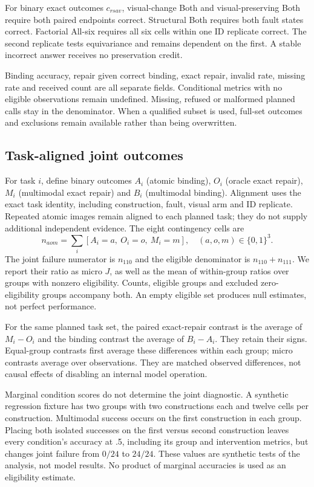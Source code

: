 \documentclass[10pt,twocolumn,letterpaper]{article}
\begin{document}
For binary exact outcomes $c_{rsav}$, visual-change Both and
visual-preserving Both require both paired endpoints correct.
Structural Both requires both fault states correct. Factorial
All-six requires all six cells within one ID replicate correct.
The second replicate tests equivariance and remains dependent on
the first. A stable incorrect answer receives no preservation credit.

Binding accuracy, repair given correct binding, exact repair,
invalid rate, missing rate and received count are all separate fields.
Conditional metrics with no eligible observations remain undefined.
Missing, refused or malformed planned calls stay in the denominator.
When a qualified subset is used, full-set outcomes and exclusions
remain available rather than being overwritten.

\subsection{Task-aligned joint outcomes}
For task $i$, define binary outcomes $A_i$ (atomic binding),
$O_i$ (oracle exact repair), $M_i$ (multimodal exact repair) and
$B_i$ (multimodal binding). Alignment uses the exact task identity,
including construction, fault, visual arm and ID replicate.
Repeated atomic images remain aligned to each planned task; they
do not supply additional independent evidence.
The eight contingency cells are
\[
n_{aom}=\sum_i[A_i=a,\ O_i=o,\ M_i=m],
\quad(a,o,m)\in\{0,1\}^3 .
\]
The joint failure numerator is $n_{110}$ and the eligible
denominator is $n_{110}+n_{111}$. We report their ratio as micro
$J$, as well as the mean of within-group ratios over groups with
nonzero eligibility. Counts, eligible groups and excluded
zero-eligibility groups accompany both. An empty eligible set
produces null estimates, not perfect performance.

For the same planned task set, the paired exact-repair contrast is
the average of $M_i-O_i$ and the binding contrast the average of
$B_i-A_i$. They retain their signs. Equal-group contrasts first
average these differences within each group; micro contrasts
average over observations. They are matched observed differences,
not causal effects of disabling an internal model operation.

Marginal condition scores do not determine the joint diagnostic.
A synthetic regression fixture has two groups with two constructions
each and twelve cells per construction. Multimodal success occurs on
the first construction in each group. Placing both isolated successes
on the first versus second construction leaves every condition's
accuracy at .5, including its group and intervention metrics, but
changes joint failure from $0/24$ to $24/24$.
These values are synthetic tests of the analysis, not model results.
No product of marginal accuracies is used as an eligibility estimate.
\end{document}
